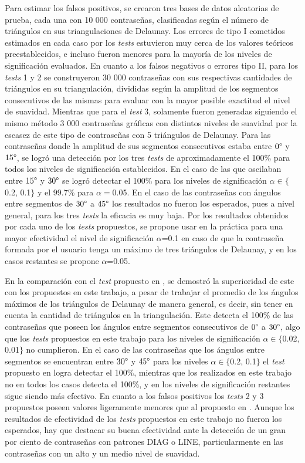 \documentclass[12pt]{report}
\begin{document}
Para estimar los falsos positivos, se crearon tres bases de datos aleatorias de prueba, cada una con 10 000 contraseñas, clasificadas según el número de triángulos en sus triangulaciones de Delaunay. Los errores de tipo I cometidos estimados en cada caso por los \textit{tests} estuvieron muy cerca de los valores teóricos preestablecidos, e incluso fueron menores para la mayoría de los niveles de significación evaluados. En cuanto a los falsos negativos o errores tipo II, para los \textit{tests} 1 y 2 se construyeron 30 000 contraseñas con sus respectivas cantidades de triángulos en  su triangulación, divididas según la amplitud de los segmentos consecutivos de las mismas para evaluar con la mayor posible exactitud el nivel de suavidad. Mientras que para el\textit{ test} 3, solamente fueron generadas siguiendo el mismo método 3 000 contraseñas gráficas con distintos niveles de suavidad por la escasez de este tipo de contraseñas con 5 triángulos de Delaunay. Para las contraseñas donde  la amplitud de sus segmentos consecutivos estaba entre $0\degree$ y $15\degree$, se logró una detección por los tres \textit{tests} de aproximadamente el 100\% para todos los niveles de significación establecidos. En el caso de las que oscilaban entre $15\degree$ y $30\degree$  se logró detectar el 100\% para los niveles de significación $\alpha \in \{$0.2, 0.1$\}$ y el 99.7\% para $\alpha=$0.05. En el caso de las contraseñas con ángulos entre segmentos de $30\degree$ a $45\degree$  los resultados no fueron los esperados, pues a nivel general, para los tres \textit{tests}  la eficacia es muy baja. Por los resultados obtenidos por cada uno de los \textit{tests} propuestos, se propone usar en la práctica para una mayor efectividad el nivel de significación $\alpha$=0.1 en caso de que la contraseña formada por el usuario tenga un máximo de tres triángulos de Delaunay, y en los casos restantes se propone  $\alpha$=0.05.

En la comparación con el \textit{test} propuesto en \cite{13}, se demostró la superioridad de este con los propuestos en este trabajo, a pesar de trabajar el promedio de los ángulos máximos de los triángulos de Delaunay de manera general, es decir, sin tener en cuenta la cantidad de triángulos en  la triangulación. Este detecta el 100\% de las contraseñas que poseen los ángulos entre segmentos consecutivos de $0\degree$ a $30\degree$, algo que los \textit{tests} propuestos en este trabajo para los niveles de significación $\alpha \in \{$0.02, 0.01$\}$ no cumplieron. En el caso de las contraseñas que los ángulos entre segmentos se encuentran entre $30\degree$ y $45\degree$ para los niveles $\alpha \in \{$0.2, 0.1$\}$ el \textit{test} propuesto en \cite{13} logra detectar el 100\%, mientras que los realizados en este trabajo no en todos los casos detecta el 100\%, y en los niveles de significación restantes sigue siendo más efectivo. En cuanto a los falsos positivos los \textit{tests} 2 y 3 propuestos poseen valores ligeramente menores que al propuesto en \cite{13}. Aunque los resultados de efectividad de los \textit{tests} propuestos en este trabajo no fueron los esperados, hay que destacar su buena efectividad ante la detección de un gran por ciento de contraseñas con patrones DIAG o LINE, particularmente en las contraseñas con un alto y un medio nivel de suavidad.
\end{document}
